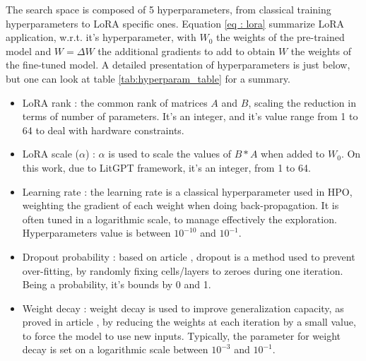 \documentclass[runningheads]{llncs}
\begin{document}
The search space is composed of 5 hyperparameters, from classical training hyperparameters to LoRA specific ones. Equation \ref{eq : lora} summarize LoRA application, w.r.t. it's hyperparameter, with $W_0$ the weights of the pre-trained model and $W=\Delta W$ the additional gradients to add to obtain $W$ the weights of the fine-tuned model. A detailed presentation of hyperparameters is just below, but one can look at table \ref{tab:hyperparam_table} for a summary.
\begin{itemize}
    \item LoRA rank : the common rank of matrices $A$ and $B$, scaling the reduction in terms of number of parameters. It's an integer, and it's value range from 1 to 64 to deal with hardware constraints.
    \item LoRA scale ($\alpha$) : $\alpha$ is used to scale the values of $B*A$ when added to $W_0$. On this work, due to LitGPT framework, it's an integer, from 1 to 64.
    \item Learning rate : the learning rate is a classical hyperparameter used in HPO, weighting the gradient of each weight when doing back-propagation. It is often tuned in a logarithmic scale, to manage effectively the exploration. Hyperparameters value is between $10^{-10}$ and $10^{-1}$.
    \item Dropout probability : based on article \cite{srivastava_dropout_2014}, dropout is a method used to prevent over-fitting, by randomly fixing cells/layers to zeroes during one iteration. Being a probability, it's bounds by 0 and 1.
    \item Weight decay : weight decay is used to improve generalization capacity, as proved in article \cite{krogh_simple_1991}, by reducing the weights at each iteration by a small value, to force the model to use new inputs. Typically, the parameter for weight decay is set on a logarithmic scale between $10^{-3}$ and $10^{-1}$.
\end{itemize}
\end{document}
